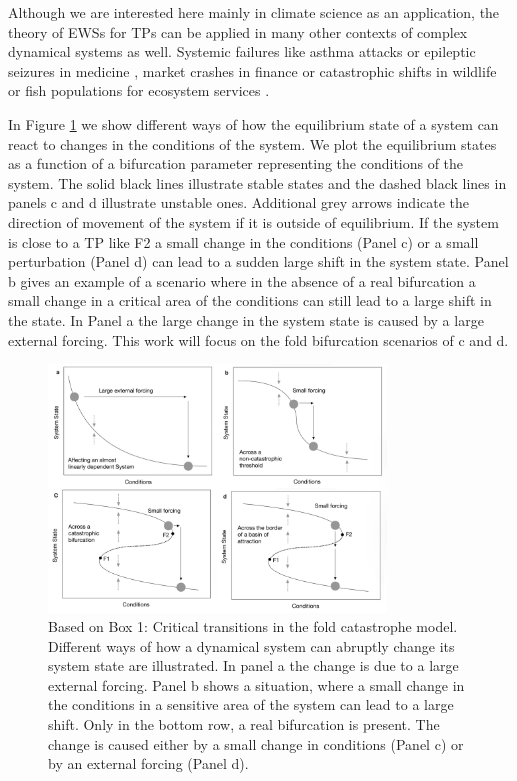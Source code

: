 \documentclass[%
thesis=student,%
coverpage=false,%
titlepage=false,%
headmarks=true, %
english,%
font=libertine, %
math=newpxtx, %
BCOR=5mm,%
coverBCOR=11mm%
]{tumbook}
\begin{document}
Although we are interested here mainly in climate science as an application, the theory of EWSs for TPs can be applied in many other contexts of complex dynamical systems as well. Systemic failures like asthma attacks \cite{Venegas:2005} or epileptic seizures in medicine \cite{Litt:2001, McSharry:2003}, market crashes in finance \cite{Kambhu:2007,May:2008} or catastrophic shifts in wildlife or fish populations for ecosystem services \cite{Scheffer:2001, MillenniumEcosystemAssessment:2005}. 

In Figure \ref{fig:Critical transitions in the fold catastrophe mode} we show different ways of how the equilibrium state of a system can react to changes in the conditions of the system. We plot the equilibrium states as a function of a bifurcation parameter representing the conditions of the system. The solid black lines illustrate stable states and the dashed black lines in panels c and d illustrate unstable ones. Additional grey arrows indicate the direction of movement of the system if it is outside of equilibrium. If the system is close to a TP like F2 a small change in the conditions (Panel c) or a small perturbation (Panel d) can lead to a sudden large shift in the system state. Panel b gives an example of a scenario where in the absence of a real bifurcation a small change in a critical area of the conditions can still lead to a large shift in the state. In Panel a the large change in the system state is caused by a large external forcing. This work will focus on the fold bifurcation scenarios of c and d.



\begin{figure}[t]
    \centering
    \includegraphics[width=0.8\textwidth]{bachelor-thesis/figures/scheffer_box_1.jpg}
    \caption{Based on \cite{Scheffer:2009} Box 1: Critical transitions in the fold catastrophe model. Different ways of how a dynamical system can abruptly change its system state are illustrated. In panel a the change is due to a large external forcing. Panel b shows a situation, where a small change in the conditions in a sensitive area of the system can lead to a large shift. Only in the bottom row, a real bifurcation is present. The change is caused either by a small change in conditions (Panel c) or by an external forcing (Panel d).}
    \label{fig:Critical transitions in the fold catastrophe mode}
\end{figure}
\end{document}
